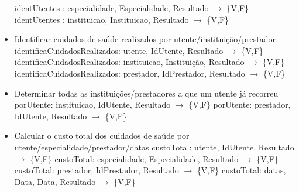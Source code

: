 \documentclass{article}
\begin{document}
\begin{itemize}
    \newline
    identUtentes : especialidade, Especialidade, Resultado $\to$ \{V,F\}
    \newline
    identUtentes : instituicao, Instituicao, Resultado $\to$ \{V,F\}
    \item Identificar cuidados de saúde realizados por utente/instituição/prestador
    \newline
    identificaCuidadosRealizados: utente, IdUtente, Resultado $\to$ \{V,F\}
    \newline
    identificaCuidadosRealizados: instituicao, Instituição, Resultado $\to$ \{V,F\}
    \newline
    identificaCuidadosRealizados: prestador, IdPrestador, Resultado $\to$ \{V,F\}
    \item Determinar todas as instituições/prestadores a que um utente já recorreu
    \newline
    porUtente: instituicao, IdUtente, Resultado $\to$ \{V,F\}
    \newline
    porUtente: prestador, IdUtente, Resultado $\to$ \{V,F\}
    \item Calcular o custo total dos cuidados de saúde por utente/especialidade/prestador/datas
    \newline
    custoTotal: utente, IdUtente, Resultado $\to$ \{V,F\}
    \newline
    custoTotal: especialidade, Especialidade, Resultado $\to$ \{V,F\}
    \newline
    custoTotal: prestador, IdPrestador, Resultado $\to$ \{V,F\}
    \newline
    custoTotal: datas, Data, Data, Resultado $\to$ \{V,F\}
\end{itemize}
\end{document}
